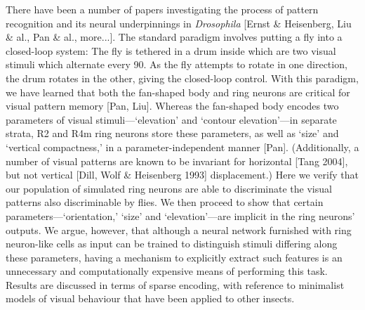 There have been a number of papers investigating the process of pattern recognition and its neural underpinnings in \emph{Drosophila} [Ernst \& Heisenberg, Liu \& al., Pan \& al., more...].
The standard paradigm involves putting a fly into a closed-loop system:
The fly is tethered in a drum inside which are two visual stimuli which alternate every 90\degree.
As the fly attempts to rotate in one direction, the drum rotates in the other, giving the closed-loop control.
With this paradigm, we have learned that both the fan-shaped body and ring neurons are critical for visual pattern memory [Pan, Liu].
Whereas the fan-shaped body encodes two parameters of visual stimuli---`elevation' and `contour elevation'---in separate strata, R2 and R4m ring neurons store these parameters, as well as `size' and `vertical compactness,' in a parameter-independent manner [Pan].
(Additionally, a number of visual patterns are known to be invariant for horizontal [Tang 2004], but not vertical [Dill, Wolf \& Heisenberg 1993] displacement.)
Here we verify that our population of simulated ring neurons are able to discriminate the visual patterns also discriminable by flies.
We then proceed to show that certain parameters---`orientation,' `size' and `elevation'---are implicit in the ring neurons' outputs.
We argue, however, that although a neural network furnished with ring neuron-like cells as input can be trained to distinguish stimuli differing along these parameters, having a mechanism to explicitly extract such features is an unnecessary and computationally expensive means of performing this task.
Results are discussed in terms of sparse encoding, with reference to minimalist models of visual behaviour that have been applied to other insects.
